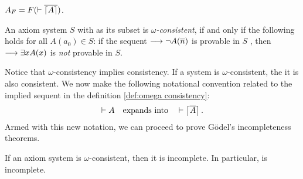 \documentclass[11pt,a4paper]{article}
\begin{document}
\begin{lemma}[10.14]\label{lem:10.14}
    \(A_F = F(\vdash\overline{\lceil A\rceil})\).
\end{lemma}

\begin{definition}\label{def:omega consistency}
    An axiom system \(S\) with \PA{} as its subset is \emph{\(\omega\)-consistent},
    if and only if the following holds for all \(A(a_0)\in S\):
    if the sequent \(\longrightarrow\lnot A(\overline{n})\) is provable in \(S\) ,
    then \(\longrightarrow\exists xA(x)\) is \emph{not} provable in \(S\).
\end{definition}

Notice that \(\omega\)-consistency implies consistency.
If a system is \(\omega\)-consistent, the it is also consistent.
We now make the following notational convention related to
the implied sequent in the definition \ref{def:omega consistency}:
\begin{equation*}
    \vdash A
    \quad\text{expands into}\quad
    \vdash\G*{\num A}\,.
\end{equation*}
Armed with this new notation, we can proceed to prove
Gödel's incompleteness theorems.

\begin{theorem}%
    \label{the:Gödel's first incompleteness theorem}
    If an axiom system is \(\omega\)-consistent,
    then it is incomplete. In particular, \PA{} is incomplete.
\end{theorem}
\end{document}
